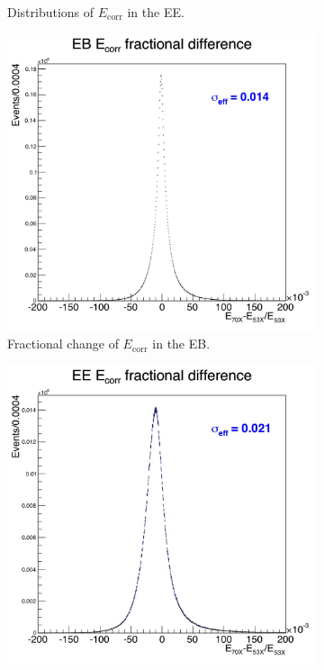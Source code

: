 \documentclass[10pt]{article}
\begin{document}
\begin{figure}[h!]
\begin{subfigure}[b]{0.4\textwidth}
                \caption{Distributions of $E_{\text{corr}}$ in the EE.}
                \label{distEE}
        \end{subfigure}
        \begin{subfigure}[b]{0.4\textwidth}
                \includegraphics[width=\textwidth]{fullRunPlots/corrEnergySC_EB}
                \caption{Fractional change of $E_{\text{corr}}$ in the EB.}
                \label{chEB}            
        \end{subfigure}
         \begin{subfigure}[b]{0.4\textwidth}
                \includegraphics[width=\textwidth]{fullRunPlots/corrEnergySC_EE}

\end{subfigure}
\end{figure}
\end{document}
